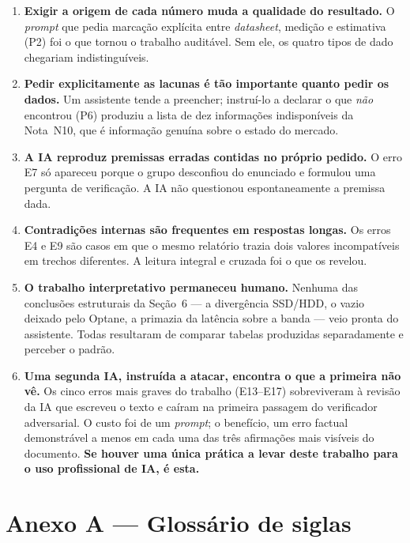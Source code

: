 \documentclass[11pt,a4paper]{article}
\begin{document}
\begin{enumerate}[label=\textbf{L\arabic*.}]
\item \textbf{Exigir a origem de cada número muda a qualidade do resultado.} O \emph{prompt}
      que pedia marcação explícita entre \emph{datasheet}, medição e estimativa (P2) foi o
      que tornou o trabalho auditável. Sem ele, os quatro tipos de dado chegariam
      indistinguíveis.
\item \textbf{Pedir explicitamente as lacunas é tão importante quanto pedir os dados.} Um
      assistente tende a preencher; instruí-lo a declarar o que \emph{não} encontrou
      (P6) produziu a lista de dez informações indisponíveis da Nota~N10, que é informação
      genuína sobre o estado do mercado.
\item \textbf{A IA reproduz premissas erradas contidas no próprio pedido.} O erro E7 só
      apareceu porque o grupo desconfiou do enunciado e formulou uma pergunta de
      verificação. A IA não questionou espontaneamente a premissa dada.
\item \textbf{Contradições internas são frequentes em respostas longas.} Os erros E4 e E9
      são casos em que o mesmo relatório trazia dois valores incompatíveis em trechos
      diferentes. A leitura integral e cruzada foi o que os revelou.
\item \textbf{O trabalho interpretativo permaneceu humano.} Nenhuma das conclusões
      estruturais da Seção~6 --- a divergência SSD/HDD, o vazio deixado pelo Optane, a
      primazia da latência sobre a banda --- veio pronta do assistente. Todas resultaram de
      comparar tabelas produzidas separadamente e perceber o padrão.
\item \textbf{Uma segunda IA, instruída a atacar, encontra o que a primeira não vê.} Os
      cinco erros mais graves do trabalho (E13--E17) sobreviveram à revisão da IA que
      escreveu o texto e caíram na primeira passagem do verificador adversarial. O custo foi
      de um \emph{prompt}; o benefício, um erro factual demonstrável a menos em cada uma das
      três afirmações mais visíveis do documento. \textbf{Se houver uma única prática a levar
      deste trabalho para o uso profissional de IA, é esta.}
\end{enumerate}

\newpage
\section*{Anexo A --- Glossário de siglas}
\end{document}
